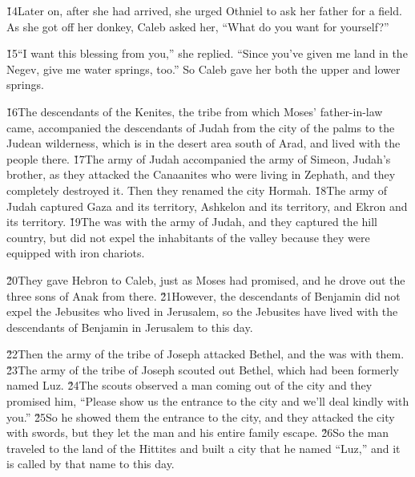 \v{14}Later on, after she had arrived, she urged Othniel to ask her father for a field. As she got off her donkey, Caleb asked her, ``What do you want for yourself?''

\v{15}``I want this blessing from you,'' she replied. ``Since you've given me land in the Negev, give me water springs, too.'' So Caleb gave her both the upper and lower springs.

\v{16}The descendants of the Kenites, the tribe from which Moses' father-in-law came, accompanied the descendants of Judah from the city of the palms to the Judean wilderness, which is in the desert area south of Arad, and lived with the people there. \v{17}The army of Judah accompanied the army of Simeon, Judah's brother, as they attacked the Canaanites who were living in Zephath, and they completely destroyed it. Then they renamed the city Hormah. \v{18}The army of Judah captured Gaza and its territory, Ashkelon and its territory, and Ekron and its territory. \v{19}The  was with the army of Judah, and they captured the hill country, but did not expel the inhabitants of the valley because they were equipped with iron chariots.

\v{20}They gave Hebron to Caleb, just as Moses had promised, and he drove out the three sons of Anak from there. \v{21}However, the descendants of Benjamin did not expel the Jebusites who lived in Jerusalem, so the Jebusites have lived with the descendants of Benjamin in Jerusalem to this day.

\v{22}Then the army of the tribe of Joseph attacked Bethel, and the  was with them. \v{23}The army of the tribe of Joseph scouted out Bethel, which had been formerly named Luz. \v{24}The scouts observed a man coming out of the city and they promised him, ``Please show us the entrance to the city and we'll deal kindly with you.'' \v{25}So he showed them the entrance to the city, and they attacked the city with swords, but they let the man and his entire family escape. \v{26}So the man traveled to the land of the Hittites and built a city that he named ``Luz,'' and it is called by that name to this day.

